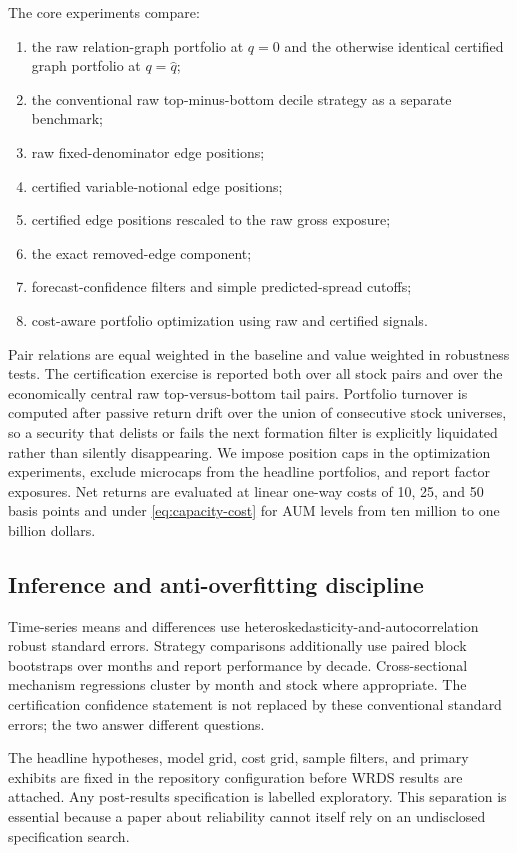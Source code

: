 The core experiments compare:
\begin{enumerate}[leftmargin=2em]
\item the raw relation-graph portfolio at $q=0$ and the otherwise identical certified graph portfolio at $q=\widehat q$;
\item the conventional raw top-minus-bottom decile strategy as a separate benchmark;
\item raw fixed-denominator edge positions;
\item certified variable-notional edge positions;
\item certified edge positions rescaled to the raw gross exposure;
\item the exact removed-edge component;
\item forecast-confidence filters and simple predicted-spread cutoffs;
\item cost-aware portfolio optimization using raw and certified signals.
\end{enumerate}

Pair relations are equal weighted in the baseline and value weighted in robustness tests. The certification exercise is reported both over all stock pairs and over the economically central raw top-versus-bottom tail pairs. Portfolio turnover is computed after passive return drift over the union of consecutive stock universes, so a security that delists or fails the next formation filter is explicitly liquidated rather than silently disappearing. We impose position caps in the optimization experiments, exclude microcaps from the headline portfolios, and report factor exposures. Net returns are evaluated at linear one-way costs of 10, 25, and 50 basis points and under \eqref{eq:capacity-cost} for AUM levels from ten million to one billion dollars.

\subsection{Inference and anti-overfitting discipline}

Time-series means and differences use heteroskedasticity-and-autocorrelation robust standard errors. Strategy comparisons additionally use paired block bootstraps over months and report performance by decade. Cross-sectional mechanism regressions cluster by month and stock where appropriate. The certification confidence statement is not replaced by these conventional standard errors; the two answer different questions.

The headline hypotheses, model grid, cost grid, sample filters, and primary exhibits are fixed in the repository configuration before WRDS results are attached. Any post-results specification is labelled exploratory. This separation is essential because a paper about reliability cannot itself rely on an undisclosed specification search.
